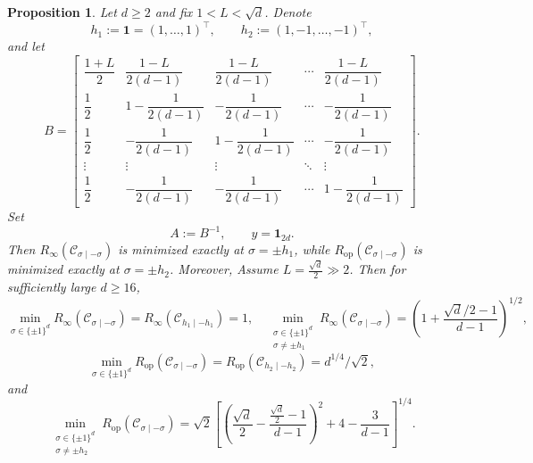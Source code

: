 \documentclass[10pt,a4paper]{amsart}
\newtheorem{proposition}{Proposition}
\begin{document}
\begin{proposition}
\label{prop5:computation}
Let $d\ge2$ and fix $1<L<\sqrt d$.
Denote
\[
h_1:=\mathbf 1=(1,\dots,1)^\top,
\qquad
h_2:=(1,-1,\dots,-1)^\top,
\]
and let
\[
B =
\begin{bmatrix}
\dfrac{1+L}{2}
&
\dfrac{1-L}{2(d-1)}
&
\dfrac{1-L}{2(d-1)}
&
\cdots
&
\dfrac{1-L}{2(d-1)}
\\[6pt]
\dfrac12
&
1-\dfrac{1}{2(d-1)}
&
-\dfrac{1}{2(d-1)}
&
\cdots
&
-\dfrac{1}{2(d-1)}
\\[6pt]
\dfrac12
&
-\dfrac{1}{2(d-1)}
&
1-\dfrac{1}{2(d-1)}
&
\cdots
&
-\dfrac{1}{2(d-1)}
\\
\vdots
&
\vdots
&
\vdots
&
\ddots
&
\vdots
\\[4pt]
\dfrac12
&
-\dfrac{1}{2(d-1)}
&
-\dfrac{1}{2(d-1)}
&
\cdots
&
1-\dfrac{1}{2(d-1)}
\end{bmatrix}.
\]
Set
\[
A:=B^{-1},
\qquad
y=\mathbf 1_{2d}.
\]
Then $R_\infty(\mathcal C_{\sigma\mid-\sigma})$
is minimized exactly at $\sigma=\pm h_1$, while
$
R_{\mathrm{op}}(\mathcal C_{\sigma\mid-\sigma})
$
is minimized exactly at $\sigma=\pm h_2$. Moreover, 
Assume $L=\frac{\sqrt d}{2}\gg 2$. Then for sufficiently large $d \geq 16$,
\[
\min_{\sigma\in\{\pm1\}^d}
R_\infty(\mathcal C_{\sigma\mid-\sigma})
=
R_\infty(\mathcal C_{h_1\mid-h_1})
=
1, \quad 
\min_{\substack{\sigma\in\{\pm1\}^d\\ \sigma\neq \pm h_1}}
R_\infty(\mathcal C_{\sigma\mid-\sigma})
=
\left(
1+\frac{\sqrt d/2-1}{d-1}
\right)^{1/2},
\]
\[
\min_{\sigma\in\{\pm1\}^d}
R_{\mathrm{op}}(\mathcal C_{\sigma\mid-\sigma})
=
R_{\mathrm{op}}(\mathcal C_{h_2\mid-h_2})
=
d^{1/4}/\sqrt{2},
\]
and
\[
\min_{\substack{\sigma\in\{\pm1\}^d\\ \sigma\neq \pm h_2}}
R_{\mathrm{op}}(\mathcal C_{\sigma\mid-\sigma})
=
\sqrt2
\left[
\left(
\frac{\sqrt d}{2}
-
\frac{\frac{\sqrt d}{2}-1}{d-1}
\right)^2
+
4-\frac{3}{d-1}
\right]^{1/4}.
\]
\end{proposition}
\end{document}
